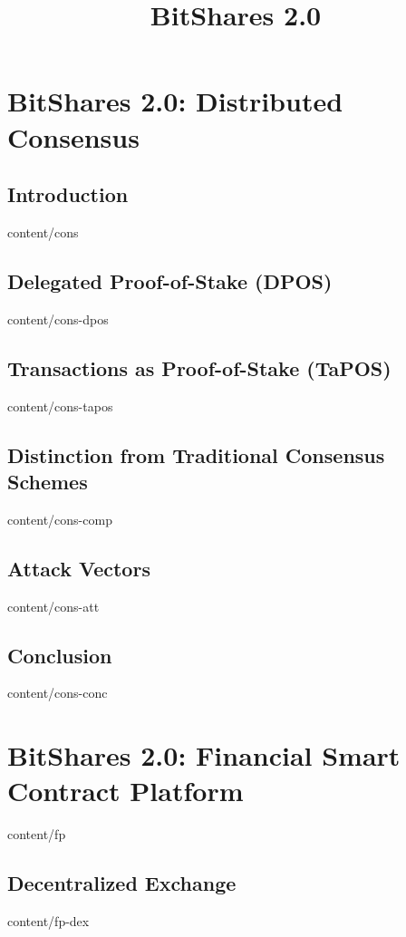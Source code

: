 \documentclass[conference,final,10pt,a4paper]{IEEEtran}
\title{BitShares 2.0}
\author{}
\begin{document}
\sloppy
\maketitle

\begin{abstract}
\end{abstract}

\section       { BitShares 2.0: Distributed Consensus             } 
\subsection    { Introduction                                     }  { content/cons          } 
\subsection    { Delegated Proof-of-Stake (DPOS)                  }  { content/cons-dpos     } 
\subsection    { Transactions as Proof-of-Stake (TaPOS)           }  { content/cons-tapos    } 
\subsection    { Distinction from Traditional Consensus Schemes   }  { content/cons-comp     } 
\subsection    { Attack Vectors                                   }  { content/cons-att      } 
\subsection    { Conclusion                                       }  { content/cons-conc     } 

\section       { BitShares 2.0: Financial Smart Contract Platform }  { content/fp            } 
\subsection    { Decentralized Exchange                           }  { content/fp-dex        } 
\end{document}
